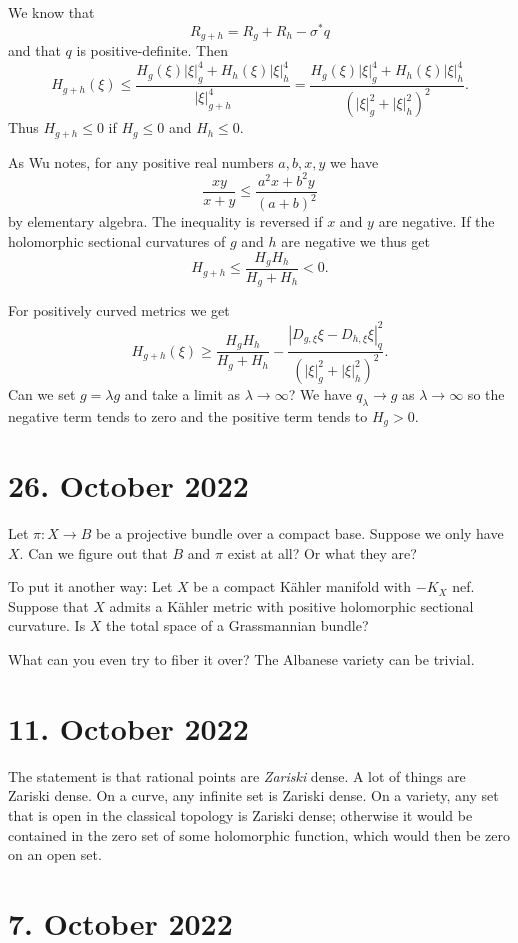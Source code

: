 \documentclass[11pt]{article}
\theoremstyle{definition}
\begin{document}
We know that
\[
R_{g + h} = R_g + R_h - \sigma^* q
\]
and that $q$ is positive-definite.
Then
\[
H_{g+h}(\xi)
\leq \frac{H_g(\xi) |\xi|^4_g + H_h(\xi) |\xi|^4_h}{|\xi|^4_{g + h}}
= \frac{H_g(\xi) |\xi|^4_g + H_h(\xi) |\xi|^4_h}{(|\xi|^2_{g} + |\xi|^2_h)^2}.
\]
Thus $H_{g + h} \leq 0$ if $H_g \leq 0$ and $H_h \leq 0$.

As Wu notes,
for any positive real numbers $a, b, x, y$ we have
\[
\frac{xy}{x + y} \leq \frac{a^2 x + b^2 y}{(a + b)^2}
\]
by elementary algebra.
The inequality is reversed if $x$ and $y$ are negative.
If the holomorphic sectional curvatures of $g$ and $h$ are negative we thus get
\[
H_{g + h} \leq \frac{H_g H_h}{H_g + H_h} < 0.
\]

For positively curved metrics we get
\[
H_{g + h}(\xi)
\geq \frac{H_g H_h}{H_g + H_h}
- \frac{|D_{g,\xi}\xi - D_{h,\xi}\xi|^2_q}
{(|\xi|_g^2 + |\xi|_h^2)^2}.
\]
Can we set $g = \lambda g$ and take a limit as $\lambda \to \infty$? We have
$q_\lambda \to g$ as $\lambda \to \infty$ so the negative term tends to zero and the positive term tends to $H_g > 0$.

\section{26. October 2022}

Let $\pi : X \to B$ be a projective bundle over a compact base.
Suppose we only have $X$.
Can we figure out that $B$ and $\pi$ exist at all?
Or what they are?

To put it another way:
Let $X$ be a compact K\"ahler manifold with $-K_X$ nef.
Suppose that $X$ admits a K\"ahler metric with positive holomorphic sectional
curvature.
Is $X$ the total space of a Grassmannian bundle?

What can you even try to fiber it over?
The Albanese variety can be trivial.




\section{11. October 2022}

The statement is that rational points are \emph{Zariski} dense.
A lot of things are Zariski dense.
On a curve, any infinite set is Zariski dense.
On a variety, any set that is open in the classical topology is Zariski dense;
otherwise it would be contained in the zero set of some holomorphic function,
which would then be zero on an open set.


\section{7. October 2022}
\end{document}

